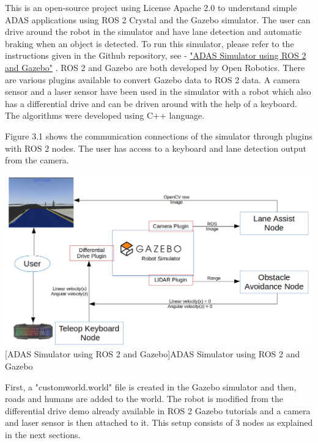 \documentclass[%
xelatex,
	oneside,		%
	12pt,			%
	parskip=half,	%
	abstracton,
	chapterprefix=true%
    appendixprefix=true]
{scrbook}
\begin{document}
\rofoot[\pagemark]{\pagemark}
This is an open-source project using License Apache 2.0 to understand simple ADAS applications using ROS 2 Crystal and the Gazebo simulator. The user can drive around the robot in the simulator and have lane detection and automatic braking when an object is detected. To run this simulator, please refer to the instructions given in the Github repository, see - \href{https://github.com/Viplav04/ADAS-ROS2-Gazebo-Simulator}{"ADAS Simulator using ROS 2 and Gazebo"} \cite{ADASsim}.
ROS 2 and Gazebo are both developed by Open Robotics. There are various plugins available to convert Gazebo data to ROS 2 data. A camera sensor and a laser sensor have been used in the simulator with a robot which also has a differential drive and can be driven around with the help of a keyboard. The algorithms were developed using C++ language.

Figure 3.1 shows the communication connections of the simulator through plugins with ROS 2 nodes. The user has access to a keyboard and lane detection output from the camera. 

	\begin{center}
\includegraphics[scale=0.4]{fig/ros2adas.png}
[ADAS Simulator using ROS 2 and Gazebo]{ADAS Simulator using ROS 2 and Gazebo}
\label{fig:ADAS}

\end{center}


First, a "customworld.world" file is created in the Gazebo simulator and then, roads and humans are added to the world. The robot is modified from the differential drive demo already available in ROS 2 Gazebo tutorials and a camera and laser sensor is then attached to it. This setup consists of 3 nodes as explained in the next sections.
\end{document}
